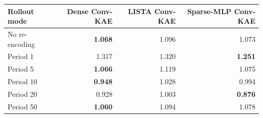 \begin{tabular}{lrrr}
\toprule
Rollout mode & Dense Conv-KAE & LISTA Conv-KAE & Sparse-MLP Conv-KAE \\
\midrule
No re-encoding & \textbf{1.068} & 1.096 & 1.073 \\
Period 1 & 1.317 & 1.320 & \textbf{1.251} \\
Period 5 & \textbf{1.066} & 1.119 & 1.075 \\
Period 10 & \textbf{0.948} & 1.028 & 0.994 \\
Period 20 & 0.928 & 1.003 & \textbf{0.876} \\
Period 50 & \textbf{1.060} & 1.094 & 1.078 \\
\bottomrule
\end{tabular}
